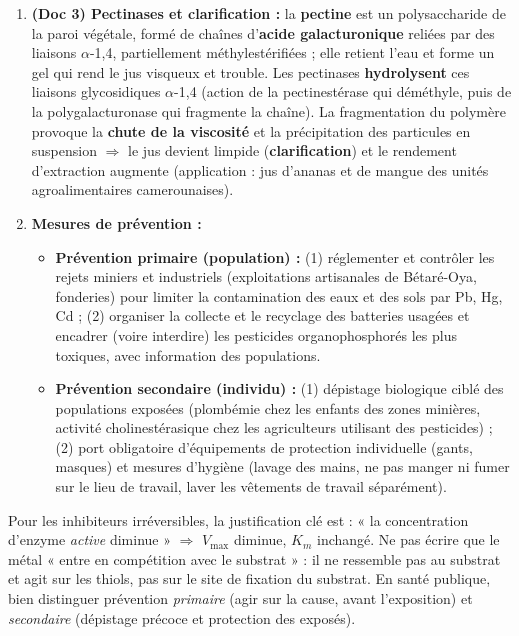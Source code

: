 \documentclass[11pt]{article}
\begin{document}
\begin{corrige}
\begin{enumerate}
    \item \textbf{(Doc 3) Pectinases et clarification :} la \textbf{pectine} est un polysaccharide de la paroi végétale, formé de chaînes d'\textbf{acide galacturonique} reliées par des liaisons $\alpha$-1,4, partiellement méthylestérifiées ; elle retient l'eau et forme un gel qui rend le jus visqueux et trouble. Les pectinases \textbf{hydrolysent} ces liaisons glycosidiques $\alpha$-1,4 (action de la pectinestérase qui déméthyle, puis de la polygalacturonase qui fragmente la chaîne). La fragmentation du polymère provoque la \textbf{chute de la viscosité} et la précipitation des particules en suspension $\Rightarrow$ le jus devient limpide (\textbf{clarification}) et le rendement d'extraction augmente (application : jus d'ananas et de mangue des unités agroalimentaires camerounaises).
    \item \textbf{Mesures de prévention :}
    \begin{itemize}
        \item \textbf{Prévention primaire (population) :} (1) réglementer et contrôler les rejets miniers et industriels (exploitations artisanales de Bétaré-Oya, fonderies) pour limiter la contamination des eaux et des sols par Pb, Hg, Cd ; (2) organiser la collecte et le recyclage des batteries usagées et encadrer (voire interdire) les pesticides organophosphorés les plus toxiques, avec information des populations.
        \item \textbf{Prévention secondaire (individu) :} (1) dépistage biologique ciblé des populations exposées (plombémie chez les enfants des zones minières, activité cholinestérasique chez les agriculteurs utilisant des pesticides) ; (2) port obligatoire d'équipements de protection individuelle (gants, masques) et mesures d'hygiène (lavage des mains, ne pas manger ni fumer sur le lieu de travail, laver les vêtements de travail séparément).
    \end{itemize}
\end{enumerate}
\end{corrige}

\begin{attention}
Pour les inhibiteurs irréversibles, la justification clé est : « la concentration d'enzyme \emph{active} diminue » $\Rightarrow$ $V_{\text{max}}$ diminue, $K_m$ inchangé. Ne pas écrire que le métal « entre en compétition avec le substrat » : il ne ressemble pas au substrat et agit sur les thiols, pas sur le site de fixation du substrat. En santé publique, bien distinguer prévention \emph{primaire} (agir sur la cause, avant l'exposition) et \emph{secondaire} (dépistage précoce et protection des exposés).
\end{attention}
\end{document}
